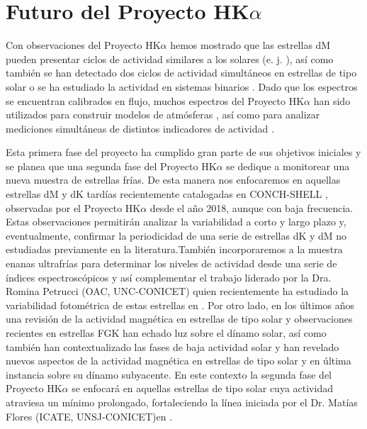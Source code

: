 \documentclass[baaa]{baaa}
\begin{document}
\section{Futuro del Proyecto HK$\alpha$}
Con observaciones del Proyecto HK$\alpha$ hemos mostrado que las estrellas dM pueden presentar ciclos de actividad similares a los solares (e. j. \citealt{2007A&A...461.1107C,2011AJ....141...34B,Ibanez20,Ibanez21}), así como también se han detectado dos ciclos de actividad simultáneos en estrellas de tipo solar \citep{Metcalfe13,Flores16} o se ha estudiado la actividad en sistemas binarios \citep{2007A&A...474..345D,Martinez19,Flores21}. Dado que los espectros se encuentran calibrados en flujo, muchos espectros del Proyecto HK$\alpha$ han sido utilizados para construir modelos de atmósferas \citep{Vieytes09,Tilipman21}, así como para analizar mediciones simultáneas de distintos indicadores de actividad \citep{2012IAUS..286..324B,Ibanez23}. 

Esta primera fase del proyecto ha cumplido gran parte de sus objetivos iniciales y se planea que una segunda fase del Proyecto HK$\alpha$ se dedique a monitorear una nueva muestra de estrellas frías. De esta manera nos enfocaremos en aquellas estrellas dM y dK tardías recientemente catalogadas en CONCH-SHELL \citep{Gaidos14}, observadas por el Proyecto HK$\alpha$ desde el año 2018, aunque con baja frecuencia. Estas observaciones permitirán analizar la variabilidad a corto y largo plazo y, eventualmente, confirmar la periodicidad de una serie de estrellas dK y dM no estudiadas previamente en la literatura.También incorporaremos a la muestra enanas ultrafrías para determinar los niveles de actividad desde una serie de índices espectroscópicos  y así complementar el trabajo liderado por la Dra. Romina Petrucci (OAC, UNC-CONICET) quien recientemente ha estudiado la variabilidad fotométrica de estas estrellas en \cite{Petrucci24}. Por otro lado, en los últimos años una revisión de la actividad magnética en estrellas de tipo solar y observaciones recientes en estrellas FGK han echado luz sobre el dínamo solar, así como también  han contextualizado las fases de baja actividad solar y han revelado nuevos aspectos de la actividad magnética en estrellas de tipo solar y en última instancia sobre su dínamo subyacente. En este contexto la segunda fase del Proyecto HK$\alpha$ se enfocará en aquellas estrellas de tipo solar cuya actividad atraviesa un mínimo prolongado, fortaleciendo la línea iniciada por el Dr. Matías Flores (ICATE, UNSJ-CONICET)en \citealt{Flores18a,Flores21}.
\end{document}

